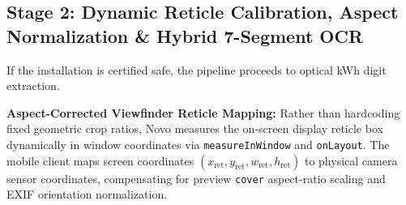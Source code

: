 \documentclass[conference]{IEEEtran}
\begin{document}
\subsection{Stage 2: Dynamic Reticle Calibration, Aspect Normalization \& Hybrid 7-Segment OCR}
If the installation is certified safe, the pipeline proceeds to optical kWh digit extraction.

\textbf{Aspect-Corrected Viewfinder Reticle Mapping:} Rather than hardcoding fixed geometric crop ratios, Novo measures the on-screen display reticle box dynamically in window coordinates via \texttt{measureInWindow} and \texttt{onLayout}. The mobile client maps screen coordinates $(x_{\text{ret}}, y_{\text{ret}}, w_{\text{ret}}, h_{\text{ret}})$ to physical camera sensor coordinates, compensating for preview \texttt{cover} aspect-ratio scaling and EXIF orientation normalization.
\end{document}
